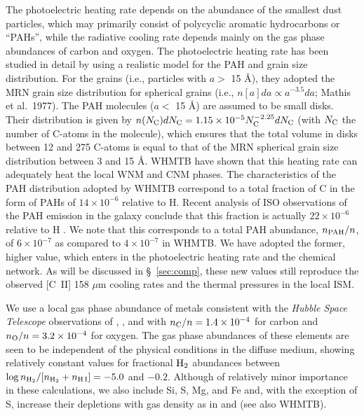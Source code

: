\documentclass[12pt,preprint,flushrt]{aastex}
\begin{document}
The photoelectric heating rate depends on the abundance of the smallest
dust particles, which may primarily consist of polycyclic aromatic
hydrocarbons or ``PAHs'',
while the radiative cooling rate depends mainly on
the gas phase abundances of carbon and oxygen.
The photoelectric heating rate has been studied in detail by \cite{bak94}
 using a realistic model for the PAH and grain size
distribution.  For the grains (i.e., particles with $a>$ 15 \AA), they
adopted the MRN grain size distribution for spherical grains (i.e.,
$n[a]da\propto a^{-3.5} da$; Mathis et al.\  1977).  The PAH
molecules ($a<$ 15 \AA) are assumed to be small disks.  Their
distribution is given by
$n(N_{\rm C})dN_{\rm C} = 1.15\times 10^{-5} N_{\rm C}^{-2.25} dN_{\rm C}$ 
(with
$N_{\rm C}$ the number of C-atoms in the molecule), which ensures 
that the total
volume in disks between 12 and 275 C-atoms is equal to that of the MRN
spherical grain size distribution between 3 and 15 \AA.  WHMTB have shown
that this heating rate can adequately heat the local WNM and CNM phases.
The characteristics of the PAH distribution
adopted by WHMTB correspond to
a total fraction of C in the form of PAHs of $14\times 10^{-6}$ relative
to H.  Recent analysis of ISO observations of the PAH emission in the
galaxy conclude that this fraction is actually $22\times 10^{-6}$
relative to H \citep{tie99}.
We note that this corresponds to a total PAH abundance,
$n_{\rm PAH}/n$,
of $6\times 10^{-7}$ as compared to $4\times 10^{-7}$ in
WHMTB.  We have adopted the former, higher value, which enters in the
photoelectric heating rate and the chemical
network.  As will be discussed in \S~\ref{sec:comp}, these new values still
reproduce the observed [C~II] 158 $\mu$m cooling rates and the thermal
pressures in the local ISM.

We use a local gas phase abundance of metals consistent with the
{\em Hubble Space Telescope} observations of \cite{sof97}, \cite{car96},
and \cite{mey98}
with  $n_{\rm C}/n=1.4 \times 10^{-4}$ for carbon and
$n_{\rm O}/n=3.2\times 10^{-4}$ for oxygen. The gas phase abundances
of these elements are seen to be independent of the physical conditions
in the diffuse medium, showing relatively constant values for fractional
${\rm H_2}$ abundances between
$\log n_{{\rm H_2}}/[n_{{\rm H_2}}+n_{\rm H\,I}]=-5.0$ and $-0.2$.
Although of relatively minor importance in these calculations, we
also include Si, S, Mg, and Fe and, with the exception of S,
increase their depletions with gas density as in \cite{jen87} and
\cite{van88} (see also WHMTB).
\end{document}
